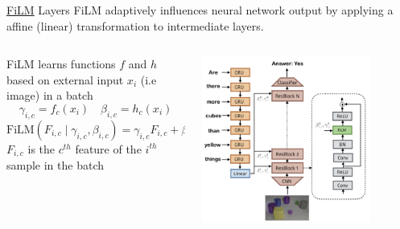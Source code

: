 \documentclass{beamer}
\begin{document}
\begin{frame}[t]{ \href{https://arxiv.org/pdf/1709.07871}{FiLM} Layers}
    FiLM adaptively influences neural network output by applying a affine (linear) transformation to intermediate layers. \newline
    \begin{columns}
        \hspace{1em}
		\begin{column}{.5\textwidth}
            FiLM learns functions $f$ and $h$  based on external input $x_i$ (i.e image) in a batch
            \small
                \[\gamma_{i,c} = f_c(x_i) \quad \beta_{i,c} = h_c(x_i)\]
                \[\text{FiLM}(F_{i,c} \mid \gamma_{i,c}, \beta_{i,c}) = \gamma_{i,c} F_{i,c} + \beta_{i,c}\]
            \normalsize
            $F_{i,c}$ is the $c^{th}$ feature of the $i^{th}$ sample in the batch
		\end{column}
        \hspace{0em}
		\begin{column}{.5\textwidth}
            \begin{center}
                \includegraphics[width=0.8\textwidth]{./img/film_arch.png}
            \end{center}
		\end{column}
	\end{columns}
\end{frame}
\end{document}
